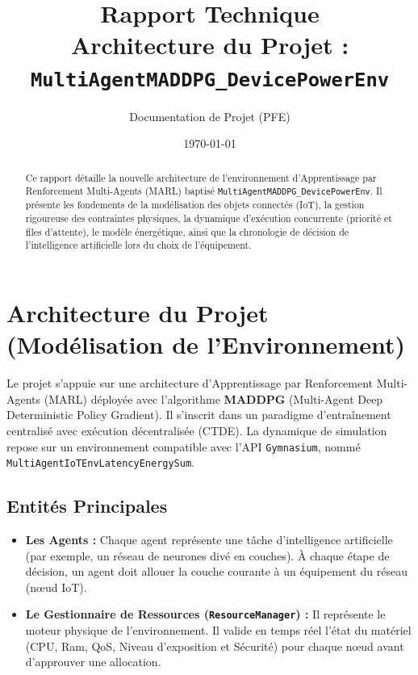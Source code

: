 \documentclass[12pt,a4paper]{article}
\title{\textbf{Rapport Technique} \\ \Large Architecture du Projet : \texttt{MultiAgentMADDPG\_DevicePowerEnv}}
\author{Documentation de Projet (PFE)}
\date{\today}
\begin{document}
\maketitle

\vspace{1cm}

\begin{abstract}
Ce rapport détaille la nouvelle architecture de l'environnement d'Apprentissage par Renforcement Multi-Agents (MARL) baptisé \texttt{MultiAgentMADDPG\_DevicePowerEnv}. Il présente les fondements de la modélisation des objets connectés (IoT), la gestion rigoureuse des contraintes physiques, la dynamique d'exécution concurrente (priorité et files d'attente), le modèle énergétique, ainsi que la chronologie de décision de l'intelligence artificielle lors du choix de l'équipement.
\end{abstract}

\newpage
\tableofcontents
\newpage

\section{Architecture du Projet (Modélisation de l'Environnement)}

Le projet s'appuie sur une architecture d'Apprentissage par Renforcement Multi-Agents (MARL) déployée avec l'algorithme \textbf{MADDPG} (Multi-Agent Deep Deterministic Policy Gradient). Il s'inscrit dans un paradigme d'entraînement centralisé avec exécution décentralisée (CTDE). La dynamique de simulation repose sur un environnement compatible avec l'API \texttt{Gymnasium}, nommé \texttt{MultiAgentIoTEnvLatencyEnergySum}.

\subsection{Entités Principales}
\begin{itemize}
    \item \textbf{Les Agents :} Chaque agent représente une tâche d'intelligence artificielle (par exemple, un réseau de neurones divé en couches). À chaque étape de décision, un agent doit allouer la couche courante à un équipement du réseau (nœud IoT).
    \item \textbf{Le Gestionnaire de Ressources (\texttt{ResourceManager}) :} Il représente le moteur physique de l'environnement. Il valide en temps réel l'état du matériel (CPU, Ram, QoS, Niveau d'exposition et Sécurité) pour chaque nœud avant d'approuver une allocation.
\end{itemize}
\end{document}
